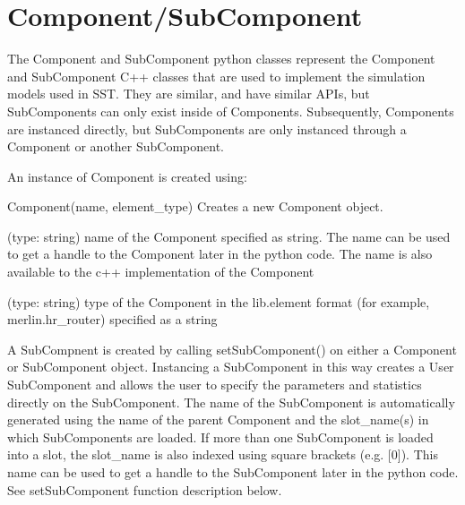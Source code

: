 \section{Component/SubComponent}

The Component and SubComponent python classes represent the Component
and SubComponent C++ classes that are used to implement the simulation
models used in SST.  They are similar, and have similar APIs, but
SubComponents can only exist inside of Components.  Subsequently,
Components are instanced directly, but SubComponents are only
instanced through a Component or another SubComponent.


An instance of Component is created using:

\begin{functiondoc}{Component(name, element_type)}
  {Creates a new Component object.}

   (type: string) name of the Component specified as
  string.  The name can be used to get a handle to the Component later
  in the python code.  The name is also available to the c++
  implementation of the Component

   (type: string) type of the Component in the
  lib.element format (for example, merlin.hr\_router) specified as a
  string

\end{functiondoc}

A SubCompnent is created by calling setSubComponent() on either a
Component or SubComponent object.  Instancing a SubComponent in this
way creates a User SubComponent and allows the user to specify the
parameters and statistics directly on the SubComponent.  The name of
the SubComponent is automatically generated using the name of the
parent Component and the slot\_name(s) in which SubComponents are
loaded.  If more than one SubComponent is loaded into a slot, the
slot\_name is also indexed using square brackets (e.g. [0]).  This
name can be used to get a handle to the SubComponent later in the
python code.  See setSubComponent function description below.


